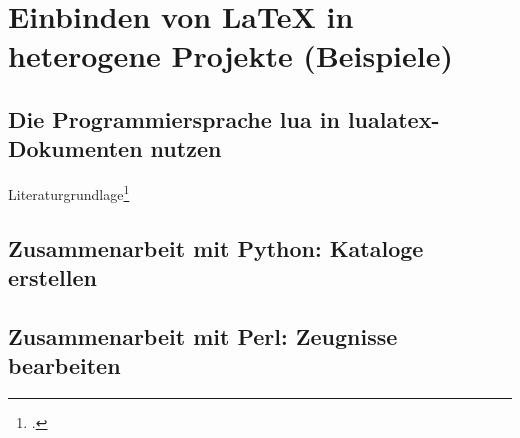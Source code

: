 \chapter{Einbinden von LaTeX in heterogene Projekte (Beispiele)}

\section{Die Programmiersprache lua in lualatex-Dokumenten nutzen}

Literaturgrundlage\footcite{ierusalimschy:programming}



\section{Zusammenarbeit mit Python: Kataloge erstellen}

\section{Zusammenarbeit mit Perl: Zeugnisse bearbeiten}
